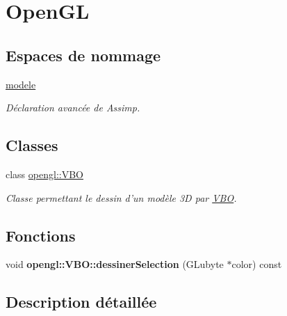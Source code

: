\hypertarget{group__opengl}{\section{Open\-G\-L}
\label{group__opengl}
}
\subsection*{Espaces de nommage}
\begin{DoxyCompactItemize}
\item 
\hyperlink{namespacemodele}{modele}
\begin{DoxyCompactList}\small\item\em Déclaration avancée de Assimp. \end{DoxyCompactList}\end{DoxyCompactItemize}
\subsection*{Classes}
\begin{DoxyCompactItemize}
\item 
class \hyperlink{classopengl_1_1_v_b_o}{opengl\-::\-V\-B\-O}
\begin{DoxyCompactList}\small\item\em Classe permettant le dessin d'un modèle 3\-D par \hyperlink{classopengl_1_1_v_b_o}{V\-B\-O}. \end{DoxyCompactList}\end{DoxyCompactItemize}
\subsection*{Fonctions}
\begin{DoxyCompactItemize}
\item 
\hypertarget{group__opengl_gafbabec4454dedc9f18b546f2ea358823}{void {\bfseries opengl\-::\-V\-B\-O\-::dessiner\-Selection} (G\-Lubyte $\ast$color) const }\label{group__opengl_gafbabec4454dedc9f18b546f2ea358823}

\end{DoxyCompactItemize}


\subsection{Description détaillée}
